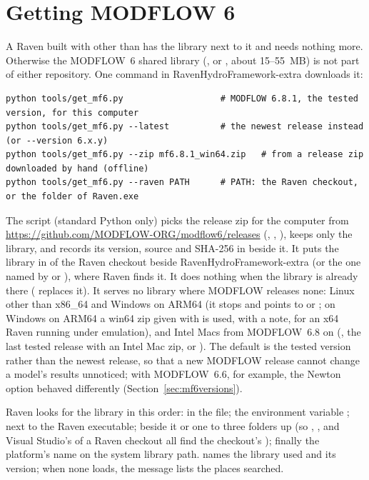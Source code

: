 \section{Getting MODFLOW 6}\label{sec:getmf6}
A Raven built with  other than  has the library next to it and needs nothing more. Otherwise
the MODFLOW~6 shared library (,  or , about 15--55~MB) is not part of
either repository. One command in RavenHydroFramework-extra downloads it:
\begin{lstlisting}
python tools/get_mf6.py                   # MODFLOW 6.8.1, the tested version, for this computer
python tools/get_mf6.py --latest          # the newest release instead (or --version 6.x.y)
python tools/get_mf6.py --zip mf6.8.1_win64.zip   # from a release zip downloaded by hand (offline)
python tools/get_mf6.py --raven PATH      # PATH: the Raven checkout, or the folder of Raven.exe
\end{lstlisting}
The script (standard Python only) picks the release zip for the computer from
\url{https://github.com/MODFLOW-ORG/modflow6/releases} (, ,
), keeps only the library, and records its version, source and SHA-256 in
 beside it. It puts the library in  of the Raven checkout beside
RavenHydroFramework-extra (or the one named by  or ), where Raven finds it. It does nothing
when the library is already there ( replaces it). It serves no library where MODFLOW releases none: Linux
other than x86\_64 and Windows on ARM64 (it stops and points to  or ; on Windows
on ARM64 a win64 zip given with  is used, with a note, for an x64 Raven running under emulation), and Intel
Macs from MODFLOW~6.8 on (, the last tested release with an Intel Mac zip, or ). The
default is the tested version rather than the newest release, so that a new MODFLOW release cannot change a model's
results unnoticed; with MODFLOW~6.6, for example, the Newton option behaved differently (Section~\ref{sec:mf6versions}).

Raven looks for the library in this order:  in the  file; the environment variable
; next to the Raven executable;  beside it or one to three folders up (so
, ,  and Visual Studio's 
of a Raven checkout all find the checkout's ); finally the platform's name on the system library path.
 names the library used and its version; when none loads, the message lists the places searched.

